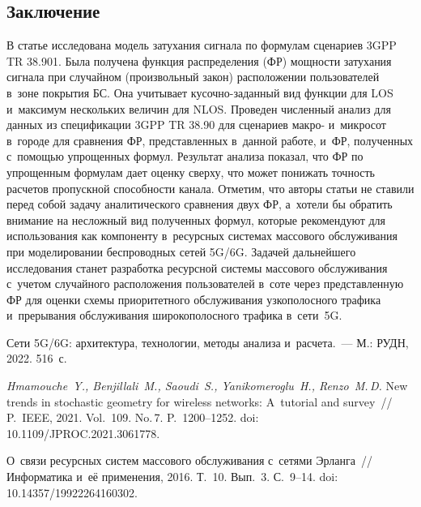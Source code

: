 \begin{multicols}{2}
\section{Заключение}

В статье исследована модель затухания сигнала по формулам сценариев 3GPP TR 
38.901. Была получена функция распределения (ФР) мощности затухания сигнала при 
случайном (произвольный закон) расположении пользователей в~зоне покрытия 
БС. Она учитывает ку\-соч\-но-за\-дан\-ный вид функции для LOS и~максимум 
нескольких величин для NLOS. Проведен численный анализ для данных из 
спецификации 3GPP TR 38.90 для сценариев макро- и~микросот в~городе для 
сравнения ФР, представленных в~данной работе, и~ФР, полученных с~по\-мощью 
упрощенных формул. Результат анализа показал, что ФР по упрощенным формулам дает 
оценку сверху, что может понижать точность расчетов пропускной способности 
канала. Отметим, что авторы статьи не ставили перед собой задачу аналитического 
сравнения двух ФР, а~хотели бы обратить внимание на несложный вид полученных 
формул, которые рекомендуют для использования как компоненту в~ресурсных 
системах массового обслуживания при моделировании беспроводных сетей 5G/6G. 
Задачей дальнейшего исследования станет разработка ресурсной системы массового 
обслуживания с~учетом случайного расположения пользователей в~соте через 
пред\-став\-лен\-ную ФР для оценки схемы приоритетного обслуживания узкополосного 
трафика и~прерывания обслуживания широкополосного трафика в~се\-ти~5G.


\vspace*{-12pt}

{\small\frenchspacing
 {\baselineskip=10.5pt
 \begin{thebibliography}{99}
 
 \vspace*{-2pt}
 
Сети 5G/6G: архитектура, технологии, методы анализа и~расчета.~--- 
М.: РУДН, 2022. 516~с.

\textit{Hmamouche~Y., Benjillali~M., Saoudi~S., Yanikomeroglu~H., Renzo~M.\,D.}
New trends in stochastic geometry for wireless networks: A~tutorial and survey~//
P.~IEEE, 2021. Vol.~109. No.\,7. P.~1200--1252.
doi: 10.1109/JPROC.2021.3061778.

О~связи ресурсных сис\-тем массового обслуживания с~сетями Эрланга~//
Информатика и~её применения, 2016. Т.~10. Вып.~3. С.~9--14.
doi: 10.14357/19922264160302.


\end{thebibliography}}}
\end{multicols}
